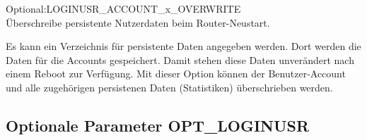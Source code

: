 \begin{description}


  Optional:LOGINUSR\_ACCOUNT\_x\_OVERWRITE\\
  Überschreibe persistente Nutzerdaten beim Router-Neustart.

   Es kann ein Verzeichnis für persistente Daten angegeben
   werden. Dort werden die Daten für die Accounts gespeichert. Damit stehen
   diese Daten unverändert nach einem Reboot zur Verfügung. Mit dieser Option
   können der Benutzer-Account und alle zugehörigen persistenen Daten
   (Statistiken) überschrieben werden.
\end{description}

\subsection {Optionale Parameter OPT\_LOGINUSR}

